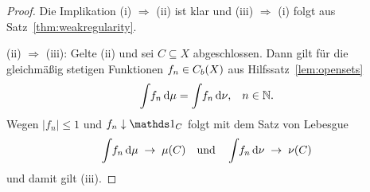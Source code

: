 \documentclass[../main/main.tex]{subfiles}
\begin{document}
	\begin{proof}
		Die Implikation (i) $\Rightarrow$ (ii) ist klar und (iii) 
		$\Rightarrow$ (i) folgt aus Satz~\ref{thm:weakregularity}.
		
		(ii) $\Rightarrow$ (iii): Gelte (ii) und sei $C \subseteq X$ abgeschlossen. 
		Dann gilt für die gleichmäßig stetigen Funktionen $f_n \in C_b(X)$ aus Hilfssatz~\ref{lem:opensets}
		$$\int_{} \, f_n \, \mathrm{d}\mu = \int_{} \, f_n \, \mathrm{d}\nu\text{,} \quad n \in \mathbb{N} \text{.}$$
		Wegen $| f_n | \leq 1$ und $f_n \convdown \indfct_C$ folgt mit dem Satz von Lebesgue 
		$$\int_{} \, f_n \, \mathrm{d}\mu \; \to \; \mu(C) \quad \text{und} \quad \int_{} \, f_n \, \mathrm{d}\nu 
		\; \to \; \nu(C)$$
		und damit gilt (iii).
	\end{proof}
	
\end{document}
